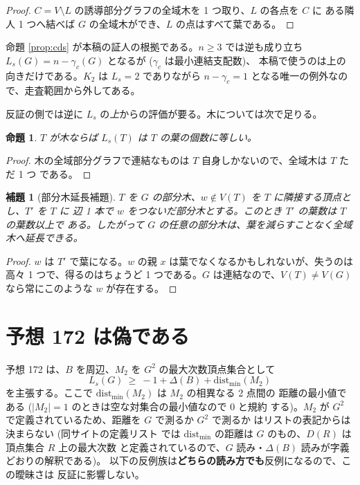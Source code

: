 \documentclass[paper=a4,fontsize=10.5pt,jafontsize=10.5pt]{jlreq}
\theoremstyle{plain}
\newtheorem{proposition}[theorem]{命題}
\newtheorem{lemma}[theorem]{補題}
\theoremstyle{definition}
\begin{document}
\begin{proof}
$C = V \setminus L$ の誘導部分グラフの全域木を 1 つ取り、$L$ の各点を $C$ に
ある隣人 1 つへ結べば $G$ の全域木ができ、$L$ の点はすべて葉である。
\end{proof}

命題 \ref{prop:cds} が本稿の証人の根拠である。$n \ge 3$ では逆も成り立ち
$L_s(G) = n - \gamma_c(G)$ となるが ($\gamma_c$ は最小連結支配数)、
本稿で使うのは上の向きだけである。$K_2$ は $L_s = 2$ でありながら
$n - \gamma_c = 1$ となる唯一の例外なので、走査範囲から外してある。

反証の側では逆に $L_s$ の\emph{上}からの評価が要る。木については次で足りる。

\begin{proposition}\label{prop:tree}
$T$ が木ならば $L_s(T)$ は $T$ の葉の個数に等しい。
\end{proposition}

\begin{proof}
木の全域部分グラフで連結なものは $T$ 自身しかないので、全域木は $T$ ただ 1 つ
である。
\end{proof}

\begin{lemma}[部分木延長補題]\label{lem:extend}
$T$ を $G$ の部分木、$w \notin V(T)$ を $T$ に隣接する頂点とし、$T'$ を $T$ に
辺 1 本で $w$ をつないだ部分木とする。このとき $T'$ の葉数は $T$ の葉数以上で
ある。したがって $G$ の任意の部分木は、葉を減らすことなく全域木へ延長できる。
\end{lemma}

\begin{proof}
$w$ は $T'$ で葉になる。$w$ の親 $x$ は葉でなくなるかもしれないが、失うのは
高々 1 つで、得るのはちょうど 1 つである。$G$ は連結なので、$V(T) \ne V(G)$
なら常にこのような $w$ が存在する。
\end{proof}

\section{予想 172 は偽である}\label{sec:172}

予想 172 は、$B$ を周辺、$M_2$ を $G^2$ の最大次数頂点集合として
\[ L_s(G) \ \ge \ -1 + \Delta(B) + \mathrm{dist}_{\min}(M_2) \]
を主張する。ここで $\mathrm{dist}_{\min}(M_2)$ は $M_2$ の相異なる 2 点間の
距離の最小値である ($|M_2| = 1$ のときは空な対集合の最小値なので 0 と規約
する)。$M_2$ が $G^2$ で定義されているため、距離を $G$ で測るか $G^2$ で測るか
はリストの表記からは決まらない (同サイトの定義リスト \cite{wowii} では
$\mathrm{dist}_{\min}$ の距離は $G$ のもの、$D(R)$ は頂点集合 $R$ 上の最大次数
と定義されているので、$G$ 読み・$\Delta(B)$ 読みが字義どおりの解釈である)。
以下の反例族は\textbf{どちらの読み方でも}反例になるので、この曖昧さは
反証に影響しない。
\end{document}
